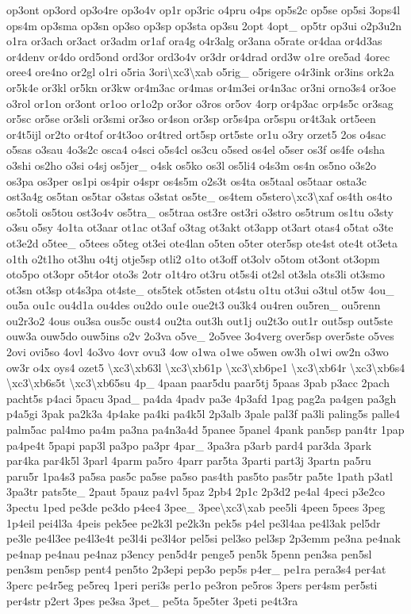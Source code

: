 {op3ont op3ord op3o4re op3o4v op1r op3ric o4pru o4ps op5s2c op5se op5si 3ops4l ops4m op3sma op3sn op3so op3sp op3sta op3su 2opt 4opt\-\_\- op5tr op3ui o2p3u2n o1ra or3ach or3act or3adm or1af ora4g o4r3alg or3ana o5rate or4daa or4d3as or4denv or4do ord5ond ord3or ord3o4v or3dr or4drad ord3w o1re ore5ad 4orec oree4 ore4no or2gl o1ri o5ria 3ori\textbackslash{}xc3\textbackslash{}xab o5rig\-\_\- o5rigere o4r3ink or3ins ork2a or5k4e or3kl or5kn or3kw or4m3ac or4mas or4m3ei or4n3ac or3ni orno3s4 or3oe o3rol or1on or3ont or1oo or1o2p or3or o3ros or5ov 4orp or4p3ac orp4s5c or3sag or5sc or5se or3sli or3smi or3so or4son or3sp or5s4pa or5spu or4t3ak ort5een or4t5ijl or2to or4tof or4t3oo or4tred ort5sp ort5ste or1u o3ry orzet5 2os o4sac o5sas o3sau 4o3s2c osca4 o4sci o5s4cl os3cu o5sed os4el o5ser os3f os4fe o4sha o3shi os2ho o3si o4sj os5jer\-\_\- o4sk os5ko os3l os5li4 o4s3m os4n os5no o3s2o os3pa os3per os1pi os4pir o4spr os4s5m o2s3t os4ta os5taal os5taar osta3c ost3a4g os5tan os5tar o3stas o3stat os5te\-\_\- os4tem o5stero\textbackslash{}xc3\textbackslash{}xaf os4th os4to os5toli os5tou ost3o4v os5tra\-\_\- os5traa ost3re ost3ri o3stro os5trum os1tu o3sty o3su o5sy 4o1ta ot3aar ot1ac ot3af o3tag ot3akt ot3app ot3art otas4 o5tat o3te ot3e2d o5tee\-\_\- o5tees o5teg ot3ei ote4lan o5ten o5ter oter5sp ote4st ote4t ot3eta o1th o2t1ho ot3hu o4tj otje5sp otli2 o1to ot3off ot3olv o5tom ot3ont ot3opm oto5po ot3opr o5t4or oto3s 2otr o1t4ro ot3ru ot5s4i ot2sl ot3sla ots3li ot3smo ot3sn ot3sp ot4s3pa ot4ste\-\_\- ots5tek ot5sten ot4stu o1tu ot3ui o3tul ot5w 4ou\-\_\- ou5a ou1c ou4d1a ou4des ou2do ou1e oue2t3 ou3k4 ou4ren ou5ren\-\_\- ou5renn ou2r3o2 4ous ou3sa ous5c oust4 ou2ta out3h out1j ou2t3o out1r out5sp out5ste ouw3a ouw5do ouw5ins o2v 2o3va o5ve\-\_\- 2o5vee 3o4verg over5sp over5ste o5ves 2ovi ovi5so 4ovl 4o3vo 4ovr ovu3 4ow o1wa o1we o5wen ow3h o1wi ow2n o3wo ow3r o4x oys4 ozet5 \textbackslash{}xc3\textbackslash{}xb63l \textbackslash{}xc3\textbackslash{}xb61p \textbackslash{}xc3\textbackslash{}xb6pe1 \textbackslash{}xc3\textbackslash{}xb64r \textbackslash{}xc3\textbackslash{}xb6s4 \textbackslash{}xc3\textbackslash{}xb6s5t \textbackslash{}xc3\textbackslash{}xb65su 4p\-\_\- 4paan paar5du paar5tj 5paas 3pab p3acc 2pach pacht5s p4aci 5pacu 3pad\-\_\- pa4da 4padv pa3e 4p3afd 1pag pag2a pa4gen pa3gh p4a5gi 3pak pa2k3a 4p4ake pa4ki pa4k5l 2p3alb 3pale pal3f pa3li paling5s palle4 palm5ac pal4mo pa4m pa3na pa4n3a4d 5panee 5panel 4pank pan5sp pan4tr 1pap pa4pe4t 5papi pap3l pa3po pa3pr 4par\-\_\- 3pa3ra p3arb pard4 par3da 3park par4ka par4k5l 3parl 4parm pa5ro 4parr par5ta 3parti part3j 3partn pa5ru paru5r 1pa4s3 pa5sa pas5c pa5se pa5so pas4th pas5to pas5tr pa5te 1path p3atl 3pa3tr pats5te\-\_\- 2paut 5pauz pa4vl 5paz 2pb4 2p1c 2p3d2 pe4al 4peci p3e2co 3pectu 1ped pe3de pe3do p4ee4 3pee\-\_\- 3pee\textbackslash{}xc3\textbackslash{}xab pee5li 4peen 5pees 3peg 1p4eil pei4l3a 4peis pek5ee pe2k3l pe2k3n pek5s p4el pe3l4aa pe4l3ak pel5dr pe3le pe4l3ee pe4l3e4t pe3l4i pe3l4or pel5si pel3so pel3sp 2p3emm pe3na pe4nak pe4nap pe4nau pe4naz p3ency pen5d4r penge5 pen5k 5penn pen3sa pen5sl pen3sm pen5sp pent4 pen5to 2p3epi pep3o pep5s p4er\-\_\- pe1ra pera3s4 per4at 3perc pe4r5eg pe5req 1peri peri3s per1o pe3ron pe5ros 3pers per4sm per5sti per4str p2ert 3pes pe3sa 3pet\-\_\- pe5ta 5pe5ter 3peti pe4t3ra }
